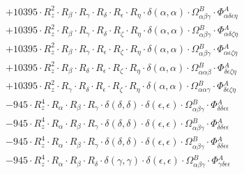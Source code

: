 \documentclass{article}
\begin{document}
\begin{subequations}
\begin{gather}
\begin{array}{c}
 \\[0.2em] 		 + 10395 \cdot R_{z}^{2} \cdot R_{\beta{}} \cdot R_{\gamma{}} \cdot R_{\delta{}} \cdot R_{\epsilon{}} \cdot R_{\eta{}} \cdot \delta{}\left(\alpha{}, \alpha{}\right) \cdot \Omega{}^{B}_{\alpha{}\beta{}\gamma{}} \cdot \Phi{}^{A}_{\alpha{}\delta{}\epsilon{}\eta{}} 
 \\[0.2em] 		 + 10395 \cdot R_{z}^{2} \cdot R_{\beta{}} \cdot R_{\gamma{}} \cdot R_{\delta{}} \cdot R_{\zeta{}} \cdot R_{\eta{}} \cdot \delta{}\left(\alpha{}, \alpha{}\right) \cdot \Omega{}^{B}_{\alpha{}\beta{}\gamma{}} \cdot \Phi{}^{A}_{\alpha{}\delta{}\zeta{}\eta{}} 
 \\[0.2em] 		 + 10395 \cdot R_{z}^{2} \cdot R_{\beta{}} \cdot R_{\gamma{}} \cdot R_{\epsilon{}} \cdot R_{\zeta{}} \cdot R_{\eta{}} \cdot \delta{}\left(\alpha{}, \alpha{}\right) \cdot \Omega{}^{B}_{\alpha{}\beta{}\gamma{}} \cdot \Phi{}^{A}_{\alpha{}\epsilon{}\zeta{}\eta{}} 
 \\[0.2em] 		 + 10395 \cdot R_{z}^{2} \cdot R_{\beta{}} \cdot R_{\delta{}} \cdot R_{\epsilon{}} \cdot R_{\zeta{}} \cdot R_{\eta{}} \cdot \delta{}\left(\alpha{}, \alpha{}\right) \cdot \Omega{}^{B}_{\alpha{}\alpha{}\beta{}} \cdot \Phi{}^{A}_{\delta{}\epsilon{}\zeta{}\eta{}} 
 \\[0.2em] 		 + 10395 \cdot R_{z}^{2} \cdot R_{\gamma{}} \cdot R_{\delta{}} \cdot R_{\epsilon{}} \cdot R_{\zeta{}} \cdot R_{\eta{}} \cdot \delta{}\left(\alpha{}, \alpha{}\right) \cdot \Omega{}^{B}_{\alpha{}\alpha{}\gamma{}} \cdot \Phi{}^{A}_{\delta{}\epsilon{}\zeta{}\eta{}} 
 \\[0.2em] 		 - 945 \cdot R_{z}^{4} \cdot R_{\alpha{}} \cdot R_{\beta{}} \cdot R_{\gamma{}} \cdot \delta{}\left(\delta{}, \delta{}\right) \cdot \delta{}\left(\epsilon{}, \epsilon{}\right) \cdot \Omega{}^{B}_{\alpha{}\beta{}\gamma{}} \cdot \Phi{}^{A}_{\delta{}\delta{}\epsilon{}\epsilon{}} 
 \\[0.2em] 		 - 945 \cdot R_{z}^{4} \cdot R_{\alpha{}} \cdot R_{\beta{}} \cdot R_{\gamma{}} \cdot \delta{}\left(\delta{}, \delta{}\right) \cdot \delta{}\left(\epsilon{}, \epsilon{}\right) \cdot \Omega{}^{B}_{\alpha{}\beta{}\gamma{}} \cdot \Phi{}^{A}_{\delta{}\delta{}\epsilon{}\epsilon{}} 
 \\[0.2em] 		 - 945 \cdot R_{z}^{4} \cdot R_{\alpha{}} \cdot R_{\beta{}} \cdot R_{\gamma{}} \cdot \delta{}\left(\delta{}, \delta{}\right) \cdot \delta{}\left(\epsilon{}, \epsilon{}\right) \cdot \Omega{}^{B}_{\alpha{}\beta{}\gamma{}} \cdot \Phi{}^{A}_{\delta{}\delta{}\epsilon{}\epsilon{}} 
 \\[0.2em] 		 - 945 \cdot R_{z}^{4} \cdot R_{\alpha{}} \cdot R_{\beta{}} \cdot R_{\delta{}} \cdot \delta{}\left(\gamma{}, \gamma{}\right) \cdot \delta{}\left(\epsilon{}, \epsilon{}\right) \cdot \Omega{}^{B}_{\alpha{}\beta{}\gamma{}} \cdot \Phi{}^{A}_{\gamma{}\delta{}\epsilon{}\epsilon{}} 

\end{array}
\end{gather}
\end{subequations}
\end{document}
